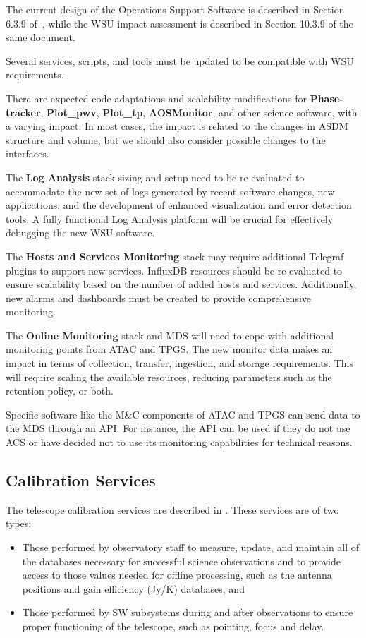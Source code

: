 The current design of the Operations Support Software is described in Section 6.3.9 of~\cite{CSA-IA}, while the WSU impact assessment is described in Section 10.3.9 of the same document.

Several services, scripts, and tools must be updated to be compatible with WSU requirements.

There are expected code adaptations and scalability modifications for \textbf{Phase-tracker}, \textbf{Plot\_pwv}, \textbf{Plot\_tp}, \textbf{AOSMonitor}, and other science software, with a varying impact. In most cases, the impact is related to the changes in ASDM structure and volume, but we should also consider possible changes to the interfaces.

The \textbf{Log Analysis} stack sizing and setup need to be re-evaluated to accommodate the new set of logs generated by recent software changes, new applications, and the development of enhanced visualization and error detection tools. A fully functional Log Analysis platform will be crucial for effectively debugging the new WSU software.

The \textbf{Hosts and Services Monitoring} stack may require additional Telegraf plugins to support new services. InfluxDB resources should be re-evaluated to ensure scalability based on the number of added hosts and services. Additionally, new alarms and dashboards must be created to provide comprehensive monitoring.

The \textbf{Online Monitoring} stack and MDS will need to cope with additional monitoring points from ATAC and TPGS. The new monitor data makes an impact in terms of collection, transfer, ingestion, and storage requirements. This will require scaling the available resources, reducing parameters such as the retention policy, or both.

Specific software like the M\&C components of ATAC and TPGS can send data to the \ac{MDS} through an API. For instance, the API can be used if they do not use ACS or have decided not to use its monitoring capabilities for technical reasons.

\subsection{Calibration Services}
\label{sec:cal-services}
The telescope calibration services are described in \cite{acsos}. These services are of two types:
\begin{itemize}[itemsep=-0.5em]
    \item Those performed by observatory staff to measure, update, and maintain all of the  databases necessary for successful science observations and to provide access to those values needed for offline processing, such as the antenna positions and gain efficiency (Jy/K) databases, and
    \item Those performed by SW subsystems during and after observations to ensure proper functioning of the telescope, such as pointing, focus and delay.
\end{itemize}

